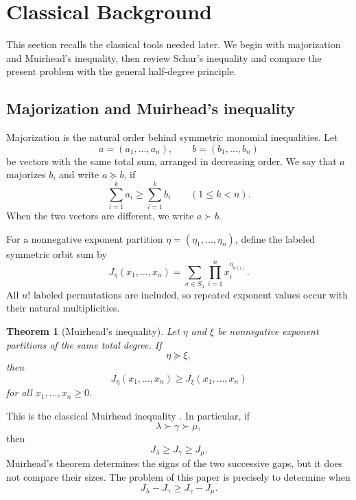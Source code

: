 \documentclass[11pt]{article}
\newtheorem{theorem}{Theorem}[section]
\theoremstyle{definition}
\begin{document}
\section{Classical Background}

This section recalls the classical tools needed later.  We begin with majorization and Muirhead's inequality, then review Schur's inequality and compare the present problem with the general half-degree principle.

\subsection{Majorization and Muirhead's inequality}

Majorization is the natural order behind symmetric monomial inequalities.  Let
\begin{equation*}
a=(a_1,\ldots,a_n),
\qquad
b=(b_1,\ldots,b_n)
\end{equation*}
be vectors with the same total sum, arranged in decreasing order.  We say that \(a\) majorizes \(b\), and write \(a\succcurlyeq b\), if
\begin{equation*}
\sum_{i=1}^k a_i\ge\sum_{i=1}^k b_i
\qquad(1\le k<n).
\end{equation*}
When the two vectors are different, we write \(a\succ b\).

For a nonnegative exponent partition \(\eta=(\eta_1,\ldots,\eta_n)\), define the labeled symmetric orbit sum by
\begin{equation*}
J_\eta(x_1,\ldots,x_n)
=\sum_{\sigma\in S_n}\prod_{i=1}^n x_i^{\eta_{\sigma(i)}}.
\end{equation*}
All \(n!\) labeled permutations are included, so repeated exponent values occur with their natural multiplicities.

\begin{theorem}[Muirhead's inequality]\label{thm:muirhead}
Let \(\eta\) and \(\xi\) be nonnegative exponent partitions of the same total degree.  If
\begin{equation*}
\eta\succcurlyeq\xi,
\end{equation*}
then
\begin{equation*}
J_\eta(x_1,\ldots,x_n)
\ge
J_\xi(x_1,\ldots,x_n)
\end{equation*}
for all \(x_1,\ldots,x_n\ge0\).
\end{theorem}

This is the classical Muirhead inequality \cite{Muirhead1902,HLP1952,MOA2011}.  In particular, if
\begin{equation*}
\lambda\succ\gamma\succ\mu,
\end{equation*}
then
\begin{equation*}
J_\lambda\ge J_\gamma\ge J_\mu.
\end{equation*}
Muirhead's theorem determines the signs of the two successive gaps, but it does not compare their sizes.  The problem of this paper is precisely to determine when
\begin{equation*}
J_\lambda-J_\gamma
\ge
J_\gamma-J_\mu.
\end{equation*}
\end{document}
